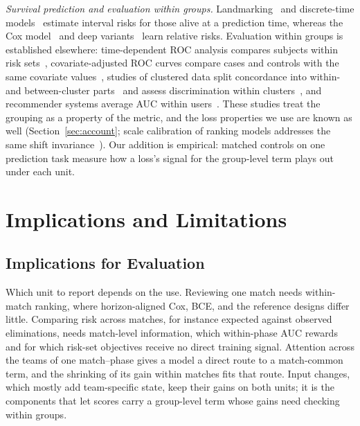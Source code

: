 \documentclass[sigconf,anonymous]{acmart}
\begin{document}
\emph{Survival prediction and evaluation within groups.} Landmarking~\cite{vanHouwelingen07} and discrete-time models~\cite{SingerWillett93,Gensheimer19} estimate interval risks for those alive at a prediction time, whereas the Cox model~\cite{Cox72} and deep variants~\cite{DeepHit18,DynamicDeepHit20} learn relative risks. Evaluation within groups is established elsewhere: time-dependent ROC analysis compares subjects within risk sets~\cite{HeagertyZheng05}, covariate-adjusted ROC curves compare cases and controls with the same covariate values~\cite{JanesPepe09}, studies of clustered data split concordance into within- and between-cluster parts~\cite{vanOirbeek10} and assess discrimination within clusters~\cite{vanKlaveren14}, and recommender systems average AUC within users~\cite{Zhou18}. These studies treat the grouping as a property of the metric, and the loss properties we use are known as well (Section~\ref{sec:account}; scale calibration of ranking models addresses the same shift invariance~\cite{Yan22}). Our addition is empirical: matched controls on one prediction task measure how a loss's signal for the group-level term plays out under each unit.

\section{Implications and Limitations}
\label{sec:discussion}
\subsection{Implications for Evaluation}
\label{sec:discussion:implications}
Which unit to report depends on the use. Reviewing one match needs within-match ranking, where horizon-aligned Cox, BCE, and the reference designs differ little. Comparing risk across matches, for instance expected against observed eliminations, needs match-level information, which within-phase AUC rewards and for which risk-set objectives receive no direct training signal. Attention across the teams of one match--phase gives a model a direct route to a match-common term, and the shrinking of its gain within matches fits that route. Input changes, which mostly add team-specific state, keep their gains on both units; it is the components that let scores carry a group-level term whose gains need checking within groups.
\end{document}
